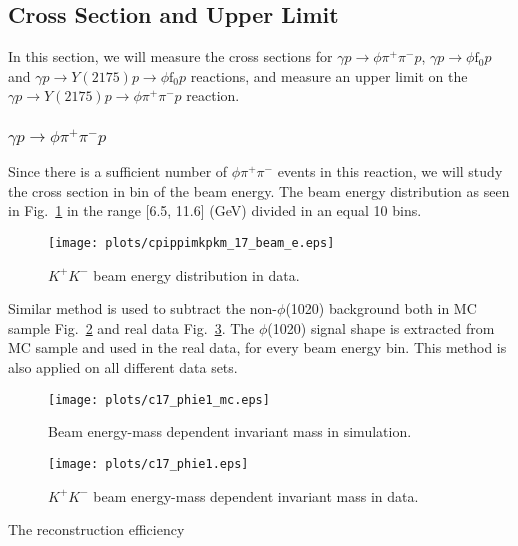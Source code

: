 \subsection{Cross Section and Upper Limit}
\label{p.4.5}

In this section, we will measure the cross sections for $\gamma p \rightarrow \phi \pi^+ \pi^- p$, $\gamma p \rightarrow \phi \mathrm{f}_0 p$ and $\gamma p \rightarrow Y(2175) p \rightarrow \phi \mathrm{f}_0 p$ reactions, and measure an upper limit on the $\gamma p \rightarrow Y(2175) p \rightarrow \phi \pi^+ \pi^- p$ reaction.

\subsubsection{\texorpdfstring{$\gamma p \rightarrow \phi \pi^+ \pi^- p$}{}}
\label{p.4.5.1}

Since there is a sufficient number of $\phi \pi^+ \pi^-$ events in this reaction, we will study the cross section in bin of the beam energy. The beam energy distribution as seen in Fig.~\ref{fig.4.5.1.1} in the range [6.5, 11.6] (GeV) divided in an equal 10 bins.

\begin{figure}[H]
    \centering
    \texttt{[image: plots/cpippimkpkm\_17\_beam\_e.eps]}
    \caption{\label{fig.4.5.1.1}$K^+ K^-$ beam energy distribution in data.}
\end{figure}

Similar method is used to subtract the non-$\phi$(1020) background both in MC sample Fig.~\ref{fig.4.5.1.2} and real data Fig.~\ref{fig.4.5.1.3}. The $\phi$(1020) signal shape is extracted from MC sample and used in the real data, for every beam energy bin. This method is also applied on all different data sets.

\begin{figure}[H]
    \centering
    \texttt{[image: plots/c17\_phie1\_mc.eps]}
    \caption{\label{fig.4.5.1.2}Beam energy-mass dependent invariant mass in simulation.}
\end{figure}

\begin{figure}[H]
    \centering
    \texttt{[image: plots/c17\_phie1.eps]}
    \caption{\label{fig.4.5.1.3}$K^+ K^-$ beam energy-mass dependent invariant mass in data.}
\end{figure}

The reconstruction efficiency 

